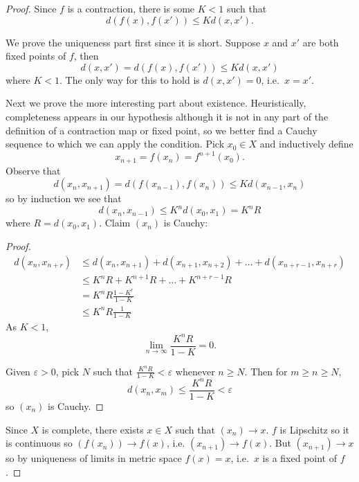 \documentclass[a4paper]{article}
\theoremstyle{definition}
\begin{document}
\begin{proof}
  Since \(f\) is a contraction, there is some \(K < 1\) such that
  \[
    d(f(x), f(x')) \leq K d(x, x').
  \]

  We prove the uniqueness part first since it is short. Suppose \(x\) and \(x'\) are both fixed points of \(f\), then
  \[
    d(x, x') = d(f(x), f(x')) \leq K d(x, x')
  \]
  where \(K < 1\). The only way for this to hold is \(d(x, x') = 0\), i.e.\ \(x = x'\).

  Next we prove the more interesting part about existence. Heuristically, completeness appears in our hypothesis although it is not in any part of the definition of a contraction map or fixed point, so we better find a Cauchy sequence to which we can apply the condition. Pick \(x_0 \in X\) and inductively define
  \[
    x_{n + 1} = f(x_n) = f^{n + 1}(x_0).
  \]
  Observe that
  \[
    d(x_n, x_{n + 1}) = d(f(x_{n - 1}), f(x_n)) \leq K d(x_{n - 1}, x_n)
  \]
  so by induction we see that
  \[
    d(x_n, x_{n - 1}) \leq K^n d(x_0, x_1) = K^n R
  \]
  where \(R = d(x_0, x_1)\). Claim \((x_n)\) is Cauchy:

  \begin{proof}
    \begin{align*}
      d(x_n, x_{n + r}) &\leq d(x_n, x_{n + 1}) + d(x_{n + 1}, x_{n + 2}) + \dots + d(x_{n + r -1}, x_{n + r}) \\
                        &\leq K^n R + K^{n + 1} R + \dots + K^{n + r - 1} R \\
                        &= K^n R \frac{1 - K^r}{1 - K} \\
                        &\leq K^n R \frac{1}{1 - K}
    \end{align*}
    As \(K < 1\),
    \[
      \lim_{n \to \infty} \frac{K^n R}{1 - K} = 0.
    \]

    Given \(\varepsilon > 0\), pick \(N\) such that \(\frac{K^nR}{1 - K} < \varepsilon\) whenever \(n \geq N\). Then for \(m \geq n \geq N\),
    \[
      d(x_n, x_m) \leq \frac{K^nR}{1 - K} < \varepsilon
    \]
    so \((x_n)\) is Cauchy.
  \end{proof}

  Since \(X\) is complete, there exists \(x \in X\) such that \((x_n) \to x\). \(f\) is Lipschitz so it is continuous so \((f(x_n)) \to f(x)\), i.e.
  \((x_{n + 1}) \to f(x)\). But \((x_{n + 1}) \to x\) so by uniqueness of limits in metric space \(f(x) = x\), i.e.\ \(x\) is a fixed point of \(f\).
\end{proof}
\end{document}
